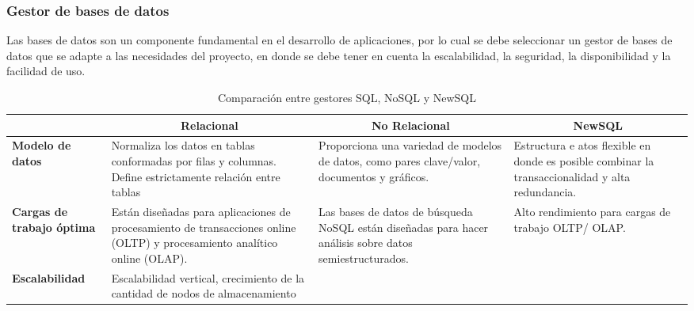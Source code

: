 \subsubsection{Gestor de bases de datos}

Las bases de datos son un componente fundamental en el desarrollo de aplicaciones, por lo cual se debe seleccionar un gestor de bases de datos que se adapte a las necesidades del proyecto, en donde se debe tener en cuenta la escalabilidad, la seguridad, la disponibilidad y la facilidad de uso.

\newpage
\begin{spacing}{1}
    \begin{center}

        \renewcommand*{\arraystretch}{1.4}
        \begin{longtable}[c]{ |>{\bfseries}p{}| p{}| p{}|  p{}|  }
            \caption[Comparación entre gestores SQL, NoSQL y NewSQL]{ Comparación entre gestores SQL, NoSQL y NewSQL\cite{lasluisa_evaluacion_2020} }\label{tab:table_sql_nosql_newsql} \\
            \hline
            \multicolumn{1}{|c|}{ \textbf{Descripción}} & \multicolumn{1}{c|}{\textbf{Relacional}} & \multicolumn{1}{c|}{ \textbf{No Relacional}} & \multicolumn{1}{c|}{ \textbf{NewSQL}} \\
            \hline
            Modelo de datos & Normaliza los datos en
            tablas conformadas por filas y columnas.
            Define estrictamente relación entre tablas
            & Proporciona una variedad
            de modelos de datos,
            como pares clave/valor,
            documentos y gráficos.
            & Estructura e atos
            flexible en donde es
            posible combinar la
            transaccionalidad y alta
            redundancia. \\
            \hline
            Cargas de trabajo óptima & Están diseñadas para
            aplicaciones de procesamiento
            de transacciones online (OLTP)
            y procesamiento analítico
            online (OLAP). & Las bases de datos de
            búsqueda NoSQL están
            diseñadas para hacer
            análisis sobre datos
            semiestructurados.
            & Alto rendimiento para
            cargas de trabajo OLTP/
            OLAP. \\
            \hline
            Escalabilidad & Escalabilidad vertical,
            crecimiento de la cantidad
            de nodos de almacenamiento

\end{longtable}
\end{center}
\end{spacing}
